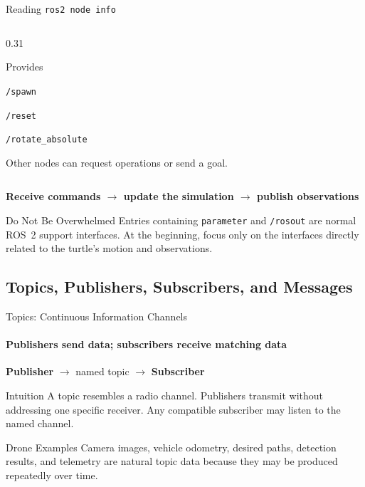 \begin{frame}{Reading \texttt{ros2 node info} }
\begin{columns}[T,onlytextwidth]
\begin{column}{0.31\textwidth}
\begin{exampleblock}{Provides}
            \vspace{0.12cm}

            \texttt{/spawn}

            \texttt{/reset}

            \texttt{/rotate\_absolute}

            \vspace{0.12cm}

            \scriptsize
            Other nodes can request operations or send a goal.
        \end{exampleblock}
    \end{column}

\end{columns}

\pause

\begin{center}
    \textbf{\color{um6p-dark}
    Receive commands
    \(\longrightarrow\)
    update the simulation
    \(\longrightarrow\)
    publish observations}
\end{center}

\begin{alertblock}{Do Not Be Overwhelmed}
    Entries containing \texttt{parameter} and \texttt{/rosout} are normal
    ROS~2 support interfaces. At the beginning, focus only on the interfaces
    directly related to the turtle's motion and observations.
\end{alertblock}

\end{frame}


\subsection{Topics, Publishers, Subscribers, and Messages}

\begin{frame}{Topics: Continuous Information Channels}
\framesubtitle{Publishers send data; subscribers receive matching data}
\begin{center}
\textbf{Publisher} $\longrightarrow$ named topic $\longrightarrow$ \textbf{Subscriber}
\end{center}
\begin{block}{Intuition}
A topic resembles a radio channel. Publishers transmit without addressing one specific receiver. Any compatible subscriber may listen to the named channel.
\end{block}
\begin{exampleblock}{Drone Examples}
Camera images, vehicle odometry, desired paths, detection results, and telemetry are natural topic data because they may be produced repeatedly over time.
\end{exampleblock}
\end{frame}

